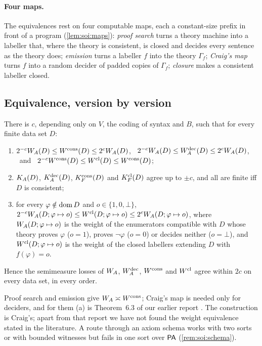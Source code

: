 \paragraph{Four maps.} The equivalences rest on four computable maps, each a constant-size prefix in front of a program (\cref{lem:soi:maps}): \emph{proof search} turns a theory machine into a labeller that, where the theory is consistent, is closed and decides every sentence as the theory does; \emph{emission} turns a labeller $f$ into the theory $\Gamma_f$; \emph{Craig's map} turns $f$ into a random decider of padded copies of $\Gamma_f$; \emph{closure} makes a consistent labeller closed.

\subsection{Equivalence, version by version}\label{sec:soi:equiv}

\begin{theorem}\label{thm:soi:coinfree}
There is $c$, depending only on $V$, the coding of syntax and $B$, such that for every finite data set $D$:
\begin{enumerate}[label=(\alph*),leftmargin=*]
\item $2^{-c}W_{A}(D)\le W^{\mathrm{cons}}(D)\le2^cW_{A}(D)$, \ $2^{-c}W_{A}(D)\le W_{A}^{\mathrm{dec}}(D)\le2^cW_{A}(D)$, \ and \ $2^{-c}W^{\mathrm{cons}}(D)\le W^{\mathrm{cl}}(D)\le W^{\mathrm{cons}}(D)$;
\item $K_{A}(D)$, $K_{A}^{\mathrm{dec}}(D)$, $K_{F}^{\mathrm{cons}}(D)$ and $K_{F}^{\mathrm{cl}}(D)$ agree up to $\pm c$, and all are finite iff $D$ is consistent;
\item for every $\varphi\notin\operatorname{dom} D$ and $o\in\{1,0,\bot\}$, $2^{-c}W_{A}(D;\varphi\mapsto o)\le W^{\mathrm{cl}}(D;\varphi\mapsto o)\le2^cW_{A}(D;\varphi\mapsto o)$, where $W_{A}(D;\varphi\mapsto o)$ is the weight of the enumerators compatible with $D$ whose theory proves $\varphi$ ($o=1$), proves $\neg\varphi$ ($o=0$) or decides neither ($o=\bot$), and $W^{\mathrm{cl}}(D;\varphi\mapsto o)$ is the weight of the closed labellers extending $D$ with $f(\varphi)=o$.
\end{enumerate}
Hence the semimeasure losses of $W_{A}$, $W_{A}^{\mathrm{dec}}$, $W^{\mathrm{cons}}$ and $W^{\mathrm{cl}}$ agree within $2c$ on every data set, in every order.
\end{theorem}

Proof search and emission give $W_{A}\asymp W^{\mathrm{cons}}$; Craig's map is needed only for deciders, and for them (a) is Theorem~6.3 of our earlier report \citep{claude2026axiominduction}. The construction is Craig's; apart from that report we have not found the weight equivalence stated in the literature. A route through an axiom schema works with two sorts or with bounded witnesses but fails in one sort over $\mathsf{PA}$ (\cref{rem:soi:schema}).

